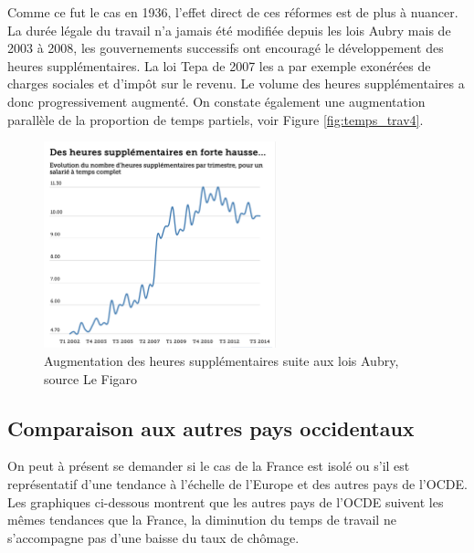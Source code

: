 \documentclass[main.tex]{subfiles}
\begin{document}
        Comme ce fut le cas en 1936, l'effet direct de ces réformes est de plus à nuancer. La durée légale du travail n'a jamais été modifiée depuis les lois Aubry mais de 2003 à 2008, les gouvernements successifs ont encouragé le développement des heures supplémentaires. La loi Tepa de 2007 les a par exemple exonérées de charges sociales et d'impôt sur le revenu. Le volume des heures supplémentaires a donc progressivement augmenté. On constate également une augmentation parallèle de la proportion de temps partiels, voir Figure \ref{fig:temps_trav4}. 

        \begin{figure}[htpb]
                \centering
                \includegraphics[width=0.6\textwidth]{fig3.png}
                \caption{Augmentation des heures supplémentaires suite aux lois Aubry, source Le Figaro}
                \label{fig:heures_supp}
        \end{figure}

        \subsection{Comparaison aux autres pays occidentaux}

        On peut à présent se demander si le cas de la France est isolé ou s'il est représentatif d'une tendance à l'échelle de l'Europe et des autres pays de l'OCDE. Les graphiques ci-dessous montrent que les autres pays de l'OCDE suivent les mêmes tendances que la France, la diminution du temps de travail ne s'accompagne pas d'une baisse du taux de chômage. 
\end{document}

